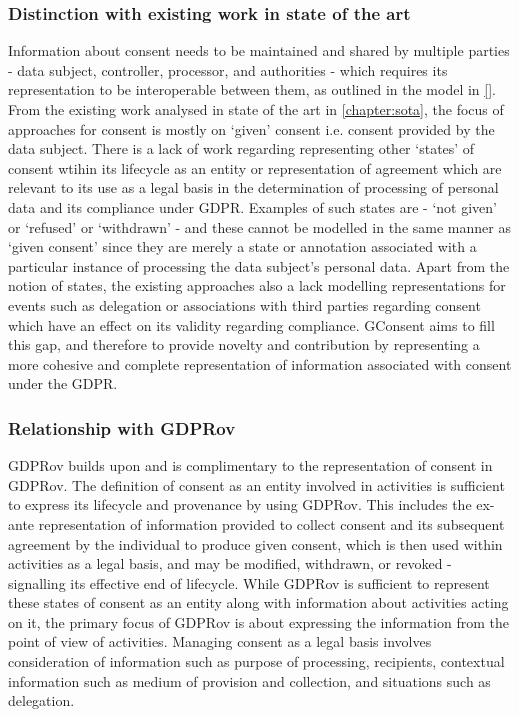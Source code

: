 \subsubsection{Distinction with existing work in state of the art}
Information about consent needs to be maintained and shared by multiple parties - data subject, controller, processor, and authorities - which requires its representation to be interoperable between them, as outlined in the model in \autoref{}.
From the existing work analysed in state of the art in \autoref{chapter:sota}, the focus of approaches for consent is mostly on `given' consent i.e. consent provided by the data subject. There is a lack of work regarding representing other `states' of consent wtihin its lifecycle as an entity or representation of agreement which are relevant to its use as a legal basis in the determination of processing of personal data and its compliance under GDPR.
Examples of such states are - `not given' or `refused' or `withdrawn' - and these cannot be modelled in the same manner as `given consent' since they are merely a state or annotation associated with a particular instance of processing the data subject's personal data.
Apart from the notion of states, the existing approaches also a lack modelling representations for events such as delegation or associations with third parties regarding consent which have an effect on its validity regarding compliance.
GConsent aims to fill this gap, and therefore to provide novelty and contribution by representing a more cohesive and complete representation of information associated with consent under the GDPR.

\subsubsection{Relationship with GDPRov}
GDPRov builds upon and is complimentary to the representation of consent in GDPRov.
The definition of consent as an entity involved in activities is sufficient to express its lifecycle and provenance by using GDPRov. This includes the ex-ante representation of information provided to collect consent and its subsequent agreement by the individual to produce given consent, which is then used within activities as a legal basis, and may be modified, withdrawn, or revoked - signalling its effective end of lifecycle.
While GDPRov is sufficient to represent these states of consent as an entity along with information about activities acting on it, the primary focus of GDPRov is about expressing the information from the point of view of activities.
Managing consent as a legal basis involves consideration of information such as purpose of processing, recipients, contextual information such as medium of provision and collection, and situations such as delegation.

